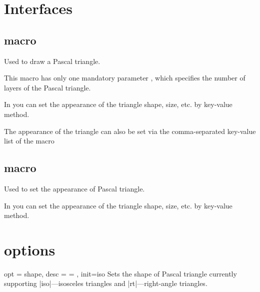 \documentclass[full]{l3doc}
\begin{document}
\begin{documentation}
\section{Interfaces}

\subsection{ macro}

\begin{function}{\pascal}
  \begin{syntax}
      
  \end{syntax}
\end{function}
Used to draw a Pascal triangle.

This macro has only one mandatory parameter ,
which specifies the number of layers of the Pascal triangle.

In  you can set the appearance of the triangle shape,
size, etc. by key-value method.

The appearance of the triangle can also be set via the comma-separated
key-value list of the  macro

\subsection{ macro}

\begin{function}{\pascalset}
  \begin{syntax}
     
  \end{syntax}
\end{function}

Used to set the appearance of Pascal triangle.

In  you can set the appearance of the triangle shape,
size, etc. by key-value method.

\section{options}

\begin{option}{ opt = shape, desc = {= }, init=iso }
  Sets the shape of Pascal triangle
  currently supporting |iso|---isosceles triangles and |rt|---right-angle triangles.
\end{option}\\
\begin{SideBySideExample}[frame=single,numbers=left,xrightmargin=.65\linewidth,gobble=2]
  \centering
  \qquad
\end{SideBySideExample}


\end{documentation}
\end{document}
